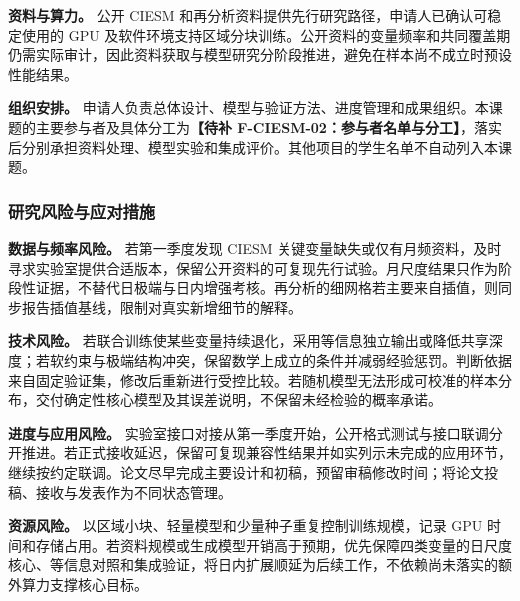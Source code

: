 \textbf{资料与算力。}
公开 CIESM 和再分析资料提供先行研究路径，申请人已确认可稳定使用的 GPU 及软件环境支持区域分块训练。公开资料的变量频率和共同覆盖期仍需实际审计，因此资料获取与模型研究分阶段推进，避免在样本尚不成立时预设性能结果。

\textbf{组织安排。}
申请人负责总体设计、模型与验证方法、进度管理和成果组织。本课题的主要参与者及具体分工为\textbf{【待补 F-CIESM-02：参与者名单与分工】}，落实后分别承担资料处理、模型实验和集成评价。其他项目的学生名单不自动列入本课题。

\subsubsection{研究风险与应对措施}

\textbf{数据与频率风险。}
若第一季度发现 CIESM 关键变量缺失或仅有月频资料，及时寻求实验室提供合适版本，保留公开资料的可复现先行试验。月尺度结果只作为阶段性证据，不替代日极端与日内增强考核。再分析的细网格若主要来自插值，则同步报告插值基线，限制对真实新增细节的解释。

\textbf{技术风险。}
若联合训练使某些变量持续退化，采用等信息独立输出或降低共享深度；若软约束与极端结构冲突，保留数学上成立的条件并减弱经验惩罚。判断依据来自固定验证集，修改后重新进行受控比较。若随机模型无法形成可校准的样本分布，交付确定性核心模型及其误差说明，不保留未经检验的概率承诺。

\textbf{进度与应用风险。}
实验室接口对接从第一季度开始，公开格式测试与接口联调分开推进。若正式接收延迟，保留可复现兼容性结果并如实列示未完成的应用环节，继续按约定联调。论文尽早完成主要设计和初稿，预留审稿修改时间；将论文投稿、接收与发表作为不同状态管理。

\textbf{资源风险。}
以区域小块、轻量模型和少量种子重复控制训练规模，记录 GPU 时间和存储占用。若资料规模或生成模型开销高于预期，优先保障四类变量的日尺度核心、等信息对照和集成验证，将日内扩展顺延为后续工作，不依赖尚未落实的额外算力支撑核心目标。
